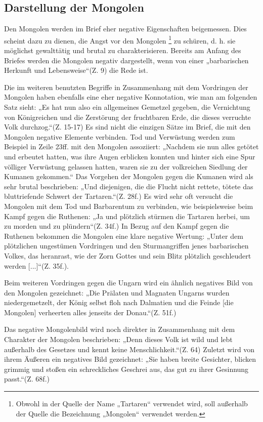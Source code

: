 \documentclass[12pt,headsepline,a4paper]{scrartcl}
\begin{document}
\subsection{Darstellung der Mongolen}
Den Mongolen werden im Brief eher negative Eigenschaften beigemessen. Dies
scheint dazu zu dienen, die Angst vor den Mongolen
\footnote{Obwohl in der Quelle der Name „Tartaren“ verwendet wird, soll außerhalb der Quelle die
Bezeichnung „Mongolen“ verwendet werden.} 
zu schüren, d. h. sie möglichst
gewalttätig und brutal zu charakterisieren. Bereits am Anfang des Briefes werden die
Mongolen negativ dargestellt, wenn von einer „barbarischen Herkunft und
Lebensweise“(Z. 9) die Rede ist.

Die im weiteren benutzten Begriffe in Zusammenhang mit dem Vordringen der
Mongolen haben ebenfalls eine eher negative Konnotation, wie man am folgenden Satz
sieht: „Es hat nun also ein allgemeines Gemetzel gegeben, die Vernichtung von
Königreichen und die Zerstörung der fruchtbaren Erde, die dieses verruchte Volk
durchzog.“(Z. 15-17) Es sind nicht die einzigen Sätze im Brief, die mit den Mongolen
negative Elemente verbinden. Tod und Verwüstung werden zum Beispiel in Zeile 23ff.
mit den Mongolen assoziiert: „Nachdem sie nun alles getötet und erbeutet hatten, was
ihre Augen erblicken konnten und hinter sich eine Spur völliger Verwüstung gelassen
hatten, waren sie zu der volkreichen Siedlung der Kumanen gekommen.“ Das Vorgehen
der Mongolen gegen die Kumanen wird als sehr brutal beschrieben: „Und diejenigen,
die die Flucht nicht rettete, tötete das bluttriefende Schwert der Tartaren.“(Z. 28f.) Es
wird sehr oft versucht die Mongolen mit dem Tod und Barbarentum zu verbinden, wie
beispielsweise beim Kampf gegen die Ruthenen: „Ja und plötzlich stürmen die Tartaren
herbei, um zu morden und zu plündern“(Z. 34f.) In Bezug auf den Kampf gegen die
Ruthenen bekommen die Mongolen eine klare negative Wertung: „Unter dem
plötzlichen ungestümen Vordringen und den Sturmangriffen jenes barbarischen Volkes,
das heranrast, wie der Zorn Gottes und sein Blitz plötzlich geschleudert werden
[...]“(Z. 35f.).

Beim weiteren Vordringen gegen die Ungarn wird ein ähnlich negatives Bild von den
Mongolen gezeichnet: „Die Prälaten und Magnaten Ungarns wurden niedergemetzelt,
der König selbst floh nach Dalmatien und die Feinde [die Mongolen] verheerten alles
jenseits der Donau.“(Z. 51f.)

Das negative Mongolenbild wird noch direkter in Zusammenhang mit dem Charakter
der Mongolen beschrieben: „Denn dieses Volk ist wild und lebt außerhalb des Gesetzes
und kennt keine Menschlichkeit.“(Z. 64) Zuletzt wird von ihrem Äußeren ein negatives
Bild gezeichnet: „Sie haben breite Gesichter, blicken grimmig und stoßen ein
schreckliches Geschrei aus, das gut zu ihrer Gesinnung passt.“(Z. 68f.)
\end{document}
